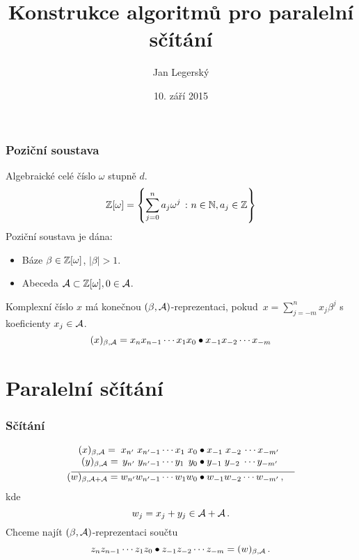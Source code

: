 \documentclass[11pt]{beamer}
\title{Konstrukce algoritmů pro paralelní sčítání}
\institute{TIGR \\
                \url{jan.legersky@gmail.com} \\
					\rule{0cm}{0mm} \\
					\rule{0cm}{0mm} \\
					Obhajoba výzkumného úkolu}
\author{Jan Legersk\'y}
\date{10. září 2015}
\begin{document}
\begin{frame}
  \titlepage
\end{frame}

\begin{frame}
  \tableofcontents
\end{frame}



\begin{frame}
  \frametitle{Poziční soustava}
  Algebraické celé číslo $\omega$ stupně $d$.
  $$\mathbb{Z}[\omega]= \left\{\sum_{j=0}^{n} a_j \omega^j\ \colon n\in\mathbb{N},  a_j \in \mathbb{Z} \right\}$$
  \pause
  Poziční soustava je dána:
  \begin{itemize}
    \item Báze $\beta \in \mathbb{Z}[\omega]$, $|\beta|>1$.
    \item Abeceda $\mathcal{A} \subset \mathbb{Z}[\omega] , 0\in \mathcal{A}$. 
  \end{itemize}
  
  Komplexní číslo $x$ má konečnou  $(\beta, \mathcal{A})$-reprezentaci, pokud~$x=\sum_{j=-m}^n x_j \beta^j$ s koeficienty $x_j\in\mathcal{A}$.
  $$
    (x)_{\beta,\mathcal{A}}=x_n x_{n-1}\cdots x_1 x_0 \bullet x_{-1} x_{-2} \cdots x_{-m}
  $$ 
\end{frame}

\section{Paralelní sčítání}
\begin{frame}
  \frametitle{Sčítání}
    \begin{align*}
  (x)_{\beta,\A}=\;x_{n'} \;x_{{n'}-1}\cdots x_1 \;x_0 &\bullet x_{-1} \;x_{-2}\, \cdots x_{-m'} \\[-3pt]
  (y)_{\beta,\A}=\,y_{n'} \;y_{{n'}-1}\cdots y_1 \,\;y_0 &\bullet y_{-1} \;y_{-2} \;\cdots y_{-m'} \\[-7pt]
    \line(1,0){130} & \line(1,0){100} \\[-7pt]
  (w)_{\beta,\A+\A}=w_{n'} w_{{n'}-1}\cdots w_1 w_0 &\bullet w_{-1} w_{-2} \cdots w_{-m'}\,,
  \end{align*}
  kde
  $$
    w_j=x_j+y_j \in \mathcal{A} +\mathcal{A}\,.
  $$
  \pause
  Chceme najít $(\beta,\mathcal{A})$-reprezentaci součtu
  $$
    z_{n} z_{n-1}\cdots z_1 z_0 \bullet z_{-1} z_{-2} \cdots z_{-m}=(w)_{\beta,\mathcal{A}}\,.
  $$ 
\end{frame}
\end{document}
